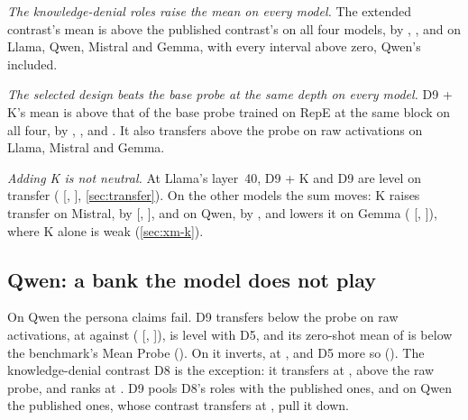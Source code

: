 \emph{The knowledge-denial roles raise the mean on every model.} The extended contrast's mean is above
the published contrast's on all four models, by ,
,  and  on
Llama, Qwen, Mistral and Gemma, with every interval above zero, Qwen's included.

\emph{The selected design beats the base probe at the same depth on every model.} D9 + K's mean is above
that of the base probe trained on RepE at the same block on all four, by ,
,  and . It
also transfers above the probe on raw activations on Llama, Mistral and Gemma.

\emph{Adding K is not neutral.} At Llama's layer~40, D9 + K and D9 are level on transfer
( [, ],
\cref{sec:transfer}). On the other models the sum moves: K raises transfer on Mistral, by
 [,
], and on Qwen, by , and lowers it on
Gemma ( [,
]), where K alone is weak (\cref{sec:xm-k}).

\subsection{Qwen: a bank the model does not play}
\label{sec:xm-qwen}

On Qwen the persona claims fail. D9 transfers below the probe on raw activations, at
 against  (
[, ]), is level with D5, and its zero-shot
mean of  is below the benchmark's Mean Probe (). On \hpkr{} it
inverts, at , and D5 more so (). The knowledge-denial contrast
D8 is the exception: it transfers at , above the raw probe, and ranks \hpkr{} at
. D9 pools D8's roles with the published ones, and on Qwen the published ones, whose
contrast transfers at , pull it down.

